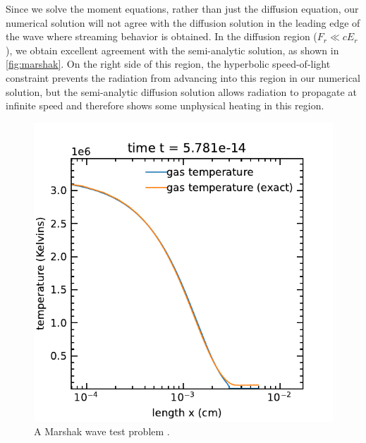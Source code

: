 \documentclass[fleqn,usenatbib]{mnras}
\begin{document}
Since we solve the moment equations, rather than just the diffusion equation, our numerical solution will not agree with the diffusion solution in the leading edge of the wave where streaming behavior is obtained. In the diffusion region ($F_r \ll cE_r$), we obtain excellent agreement with the semi-analytic solution, as shown in \autoref{fig:marshak}. On the right side of this region, the hyperbolic speed-of-light constraint prevents the radiation from advancing into this region in our numerical solution, but the semi-analytic diffusion solution allows radiation to propagate at infinite speed and therefore shows some unphysical heating in this region.
\begin{figure}
    \includegraphics[width=\columnwidth]{marshak_wave_cgs_gastemperature.pdf}
    \caption{A Marshak wave test problem \citep{Su_1996}.}
    \label{fig:marshak}
\end{figure}
\end{document}
